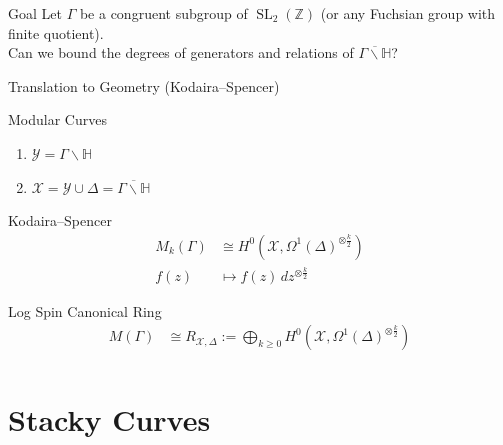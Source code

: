 \documentclass{beamer}
\theoremstyle{remark}
\newcommand\BH{{\mathbb H}}
\newcommand\BBZ{{\mathbb Z}}
\newcommand \sx{{\mathscr X}}
\newcommand \sy{{\mathscr Y}}
\newcommand{\SL}{\operatorname{SL}}
\begin{document}

\begin{frame}

\begin{block}{Goal}
Let $\Gamma$ be a congruent subgroup of $\SL_2(\BBZ)$ (or any Fuchsian group with finite quotient). \\
Can we bound the degrees of generators and relations of $\overline{\Gamma \backslash \mathbb{H}}$?
\end{block}

\end{frame}


\begin{frame}{Translation to Geometry (Kodaira--Spencer)}
\begin{block}{Modular Curves}
\begin{enumerate}
  \item $\sy = \Gamma \backslash \BH$
  \item $\sx = \sy \cup \Delta = \overline{\Gamma \backslash \BH}$
\end{enumerate}
\end{block}

\begin{block}{Kodaira--Spencer}
\begin{align*}
  M_k(\Gamma) &\cong H^0(\sx, \Omega^1(\Delta)^{\otimes \frac{k}{2}}) \\
	f(z) &\mapsto f(z)\, dz^{\otimes \frac{k}{2}}
\end{align*}
\end{block}

\begin{block}{Log Spin Canonical Ring}
\begin{align*}
  M(\Gamma) &\cong R_{\sx,\Delta} := \bigoplus_{k \geq 0} H^0(\sx, \Omega^1(\Delta)^{\otimes \frac{k}{2}}) \\
\end{align*}
\end{block}

\end{frame}

\section{Stacky Curves}
\end{document}
